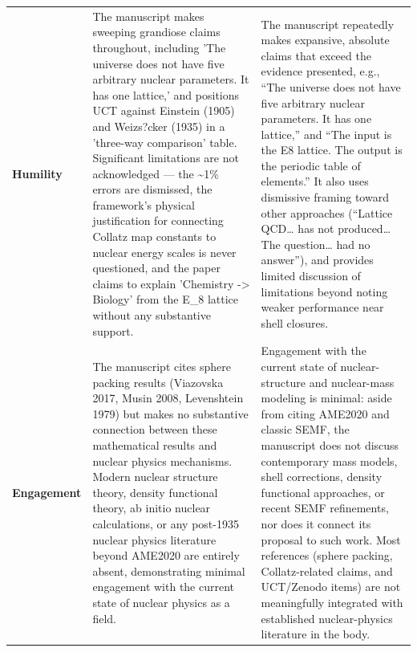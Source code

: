 \documentclass[11pt]{article}
\begin{document}
\begin{longtable}{@{} p{2.2cm} p{6.3cm} p{6.3cm} @{}}
\rowcolor{rowgray}
\textbf{Humility} &
The manuscript makes sweeping grandiose claims throughout, including 'The universe does not have five arbitrary nuclear parameters. It has one lattice,' and positions UCT against Einstein (1905) and Weizs?cker (1935) in a 'three-way comparison' table. Significant limitations are not acknowledged --- the \textasciitilde{}1\% errors are dismissed, the framework's physical justification for connecting Collatz map constants to nuclear energy scales is never questioned, and the paper claims to explain 'Chemistry -> Biology' from the E\_8 lattice without any substantive support. &
The manuscript repeatedly makes expansive, absolute claims that exceed the evidence presented, e.g., ``The universe does not have five arbitrary nuclear parameters. It has one lattice,'' and ``The input is the E8 lattice. The output is the periodic table of elements.'' It also uses dismissive framing toward other approaches (``Lattice QCD\ldots{} has not produced\ldots{} The question\ldots{} had no answer''), and provides limited discussion of limitations beyond noting weaker performance near shell closures. \\[6pt]

\textbf{Engagement} &
The manuscript cites sphere packing results (Viazovska 2017, Musin 2008, Levenshtein 1979) but makes no substantive connection between these mathematical results and nuclear physics mechanisms. Modern nuclear structure theory, density functional theory, ab initio nuclear calculations, or any post-1935 nuclear physics literature beyond AME2020 are entirely absent, demonstrating minimal engagement with the current state of nuclear physics as a field. &
Engagement with the current state of nuclear-structure and nuclear-mass modeling is minimal: aside from citing AME2020 and classic SEMF, the manuscript does not discuss contemporary mass models, shell corrections, density functional approaches, or recent SEMF refinements, nor does it connect its proposal to such work. Most references (sphere packing, Collatz-related claims, and UCT/Zenodo items) are not meaningfully integrated with established nuclear-physics literature in the body. \\[6pt]


\end{longtable}
\end{document}
